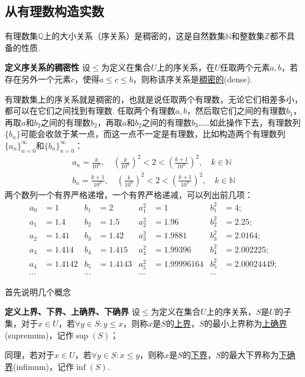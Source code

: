 \documentclass[UTF8]{ctexart}
\newenvironment{definition}[1]
    {\begin{tcolorbox}[enhanced, colback=LightYellow, breakable=false, frame hidden, borderline west={1.5mm}{-2mm}{DarkGreen}]
    {\bfseries {\color{DarkGreen} 定义}\quad #1} \newline}
    {\end{tcolorbox}}
\begin{document}
\subsection{从有理数构造实数}

有理数集\(\mathbb{Q}\)上的大小关系（序关系）是稠密的，这是自然数集\(\mathbb{N}\)和整数集\(\mathbb{Z}\)都不具备的性质.

\begin{definition}{序关系的稠密性}
    设\(\leq\)为定义在集合\(U\)上的序关系，在\(U\)任取两个元素\(a,b\)，若存在另外一个元素\(c\)，使得\(a\leq c \leq b\)，则称该序关系是\uline{稠密的}(dense).
\end{definition}

有理数集上的序关系就是稠密的，也就是说任取两个有理数，无论它们相差多小，都可以在它们之间找到有理数. 任取两个有理数\(a,b\)，然后取它们之间的有理数\(b_1\)，再取\(a\)和\(b_2\)之间的有理数\(b_2\)，再取\(a\)和\(b_2\)之间的有理数\(b_3\)……如此操作下去，有理数列\(\{b_n\}\)可能会收敛于某一点，而这一点不一定是有理数，比如构造两个有理数列\(\{a_n\}_{n=0}^{\infty}\)和\(\{b_n\}_{n=0}^{\infty}\)：
\begin{eqnarray*}
    a_n=\frac{k}{10^n}, \quad\left(\frac{k}{10^n}\right)^2<2<\left(\frac{k+1}{10^n}\right)^2, \quad k\in\mathbb{N} \\
    b_n=\frac{k+1}{10^n}, \quad\left(\frac{k}{10^n}\right)^2<2<\left(\frac{k+1}{10^n}\right)^2, \quad k\in\mathbb{N}
\end{eqnarray*}
两个数列一个有界严格递增，一个有界严格递减，可以列出前几项：
\newline
\begin{align*}
a_0 &= 1 & b_1 &= 2 & a_1^2 &= 1 & b_1^2 &= 4; \\
a_1 &= 1.4 & b_2 &= 1.5 & a_2^2 &= 1.96 & b_2^2 &= 2.25; \\
a_2 &= 1.41 & b_3 &= 1.42 & a_3^2 &= 1.9881 & b_3^2 &= 2.0164; \\
a_3 &= 1.414 & b_4 &= 1.415 & a_4^2 &= 1.99396 & b_4^2 &= 2.002225; \\
a_4 &= 1.4142 & b_5 &= 1.4143 & a_5^2 &= 1.99996164 & b_5^2 &= 2.00024449; \\
\cdots & & \cdots && \cdots && \cdots
\end{align*}

首先说明几个概念
\begin{definition}{上界、下界、上确界、下确界}
    设\(\leq\)为定义在集合\(U\)上的序关系，\(S\)是\(U\)的子集，对于\(x \in U\)，若\(\forall y\in S: y\leq x\)，则称\(x\)是\(S\)的\uline{上界}，\(S\)的最小上界称为\uline{上确界}(supremum)，记作\(\sup(S)\)；
    \par
    同理，若对于\(x \in U\)，若\(\forall y\in S: x\leq y\)，则称\(x\)是\(S\)的\uline{下界}，\(S\)的最大下界称为\uline{下确界}(infimum)，记作\(\inf(S)\).
\end{definition}
\end{document}
